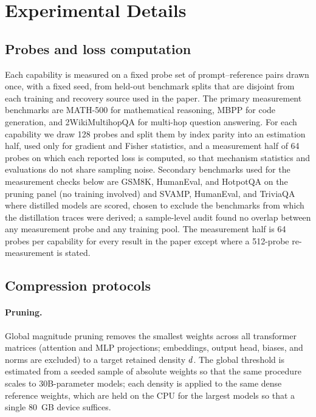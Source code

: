 \section{Experimental Details}
\label{sec:app_details}
\subsection{Probes and loss computation}
\label{sec:app_probes}
Each capability is measured on a fixed probe set of prompt--reference
pairs drawn once, with a fixed seed, from held-out benchmark splits that
are disjoint from each training and recovery source used in the paper.
The primary measurement benchmarks are MATH-500 for mathematical
reasoning, MBPP for code generation, and 2WikiMultihopQA for multi-hop
question answering. For each capability we draw 128 probes and split
them by index parity into an estimation half, used only for gradient
and Fisher statistics, and a measurement half of 64 probes on which
each reported loss is computed, so that mechanism statistics and
evaluations do not share sampling noise. Secondary benchmarks used for the measurement checks below are
GSM8K, HumanEval, and HotpotQA on the pruning panel (no training
involved) and SVAMP, HumanEval, and TriviaQA where distilled models are
scored, chosen to exclude the benchmarks from which the distillation
traces were derived; a sample-level audit found no overlap between any
measurement probe and any training pool. The measurement half is 64
probes per capability for every result in the paper except where a
512-probe re-measurement is stated.


\subsection{Compression protocols}
\label{sec:app_compress}
\paragraph{Pruning.} Global magnitude pruning removes the smallest
weights across all transformer matrices (attention and MLP projections;
embeddings, output head, biases, and norms are excluded) to a target
retained density $d$. The global threshold is estimated from a
seeded sample of absolute weights so that the same procedure scales to
30B-parameter models; each density is applied to the same dense
reference weights, which are held on the CPU for the largest models so
that a single 80~GB device suffices.


